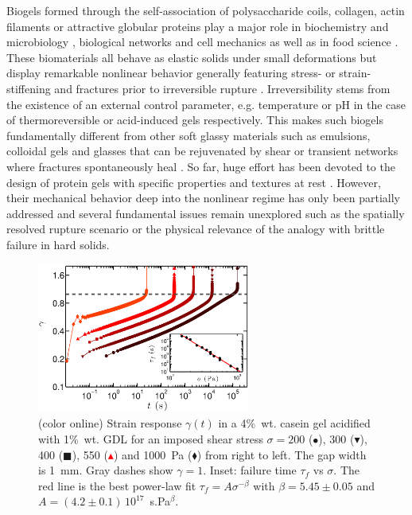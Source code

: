 \documentclass[twocolumn,superscriptaddress,showpacs,preprintnumbers,amsmath,amssymb,prl]{revtex4}
\begin{document}
Biogels formed through the self-association of polysaccharide coils, collagen, actin filaments or attractive globular proteins play a major role in biochemistry and microbiology \cite{Viovy:2000}, biological networks and cell mechanics \cite{Stricker:2010} as well as in food science \cite{Mezzenga:2005}. These biomaterials all behave as elastic solids under small deformations but display remarkable nonlinear behavior generally featuring stress- or strain-stiffening \cite{Gardel:2004} and fractures prior to irreversible rupture \cite{Bonn:1998,Baumberger:2006}. Irreversibility stems from the existence of an external control parameter, e.g. temperature or pH in the case of thermoreversible or acid-induced gels respectively. This makes such biogels fundamentally different from other soft glassy materials such as emulsions, colloidal gels and glasses that can be rejuvenated by shear \cite{Cloitre:2000,Caton:2008,Divoux:2011,Siebenburger:2012} or transient networks where fractures spontaneously heal \cite{Tabuteau:2009,Skrzeszewska:2010}. So far, huge effort has been devoted to the design of protein gels with specific properties and textures at rest \cite{Dickinson:2006,Gibaud:2012}. However, their mechanical behavior deep into the nonlinear regime has only been partially addressed \cite{vanVliet:1995,Pouzot:2006} and several fundamental issues remain unexplored such as the spatially resolved rupture scenario or the physical relevance of the analogy with brittle failure in hard solids.

\begin{figure}
\centering
\includegraphics[width=7cm]{Fig1.eps}
\caption{(color online) Strain response $\gamma(t)$ in a 4\%~wt. casein gel acidified with 1\%~wt. GDL for an imposed shear stress $\sigma=200$ (\textcolor{red!25!black}{$\bullet$}), 300 (\textcolor{red!50!black}{$\blacktriangledown$}), 400 (\textcolor{red!75!black}{$\blacksquare$}), 550 (\textcolor{red}{$\blacktriangle$}) and 1000~Pa (\textcolor{orange!50!red}{$\blacklozenge$}) from right to left. The gap width is 1~mm. Gray dashes show $\gamma=1$. Inset: failure time $\tau_f$ vs $\sigma$. The red line is the best power-law fit $\tau_f=A\sigma^{-\beta}$ with $\beta=5.45\pm 0.05$ and $A=(4.2\pm 0.1)\,10^{17}$~s.Pa$^\beta$.
\label{fig1}}
\end{figure} 
\end{document}
